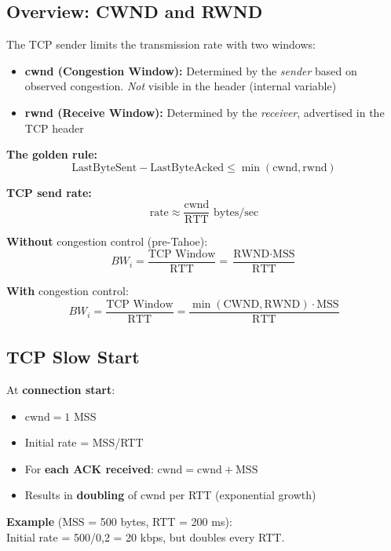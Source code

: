 \subsection{Overview: CWND and RWND}

\begin{keybox}
The TCP sender limits the transmission rate with two windows:
\begin{itemize}[noitemsep]
    \item \textbf{cwnd (Congestion Window):} Determined by the \emph{sender} based on observed congestion. \emph{Not} visible in the header (internal variable)
    \item \textbf{rwnd (Receive Window):} Determined by the \emph{receiver}, advertised in the TCP header
\end{itemize}

\textbf{The golden rule:}
\[
\text{LastByteSent} - \text{LastByteAcked} \leq \min(\text{cwnd}, \text{rwnd})
\]

\textbf{TCP send rate:}
\[
\text{rate} \approx \frac{\text{cwnd}}{\text{RTT}} \text{ bytes/sec}
\]
\end{keybox}

\begin{formulabox}
\textbf{Without} congestion control (pre-Tahoe):
\[
BW_i = \frac{\text{TCP Window}}{\text{RTT}} = \frac{\text{RWND} \cdot \text{MSS}}{\text{RTT}}
\]

\textbf{With} congestion control:
\[
BW_i = \frac{\text{TCP Window}}{\text{RTT}} = \frac{\min(\text{CWND}, \text{RWND}) \cdot \text{MSS}}{\text{RTT}}
\]
\end{formulabox}

\subsection{TCP Slow Start}

\begin{keybox}
At \textbf{connection start}:
\begin{itemize}[noitemsep]
    \item $\text{cwnd} = 1$ MSS
    \item Initial rate = MSS/RTT
    \item For \textbf{each ACK received}: $\text{cwnd} = \text{cwnd} + \text{MSS}$
    \item Results in \textbf{doubling} of cwnd per RTT (exponential growth)
\end{itemize}

\textbf{Example} (MSS = 500 bytes, RTT = 200 ms):\\
Initial rate = 500/0{,}2 = 20 kbps, but doubles every RTT.
\end{keybox}

